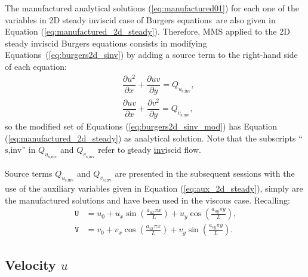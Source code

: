 \documentclass[10pt]{article}
\newcommand{\diff}[2] {\dfrac{\partial #1}{\partial #2}}
\newcommand{\U}{\,\mathtt{U}}
\newcommand{\V}{\,\mathtt{V}}
\begin{document}
The manufactured analytical solutions (\ref{eq:manufactured01}) for each one of the variables in 2D steady inviscid case of Burgers equations~are also given in Equation (\ref{eq:manufactured_2d_steady}).
%
Therefore, MMS applied to the 2D steady inviscid Burgers equations consists in modifying Equations~(\ref{eq:burgers2d_sinv}) by adding a source term to the right-hand side of each equation:
\begin{equation}
 \label{eq:burgers2d_sinv_mod}
\begin{split}
 & \diff{ u^2 }{x}+\diff{uv}{y}= Q_{u_\text{s,inv}},\\
& \diff{ u v}{x} + \diff{  v^2 }{y}=Q_{v_\text{s,inv}},
\end{split}
\end{equation}
so the modified set of Equations (\ref{eq:burgers2d_sinv_mod}) has Equation (\ref{eq:manufactured_2d_steady}) as analytical solution. Note that the subscripts ``$\text{s,inv}$'' in $Q_{u_\text{s,inv}}$ and $Q_{v_\text{s,inv}}$  refer to \underline{s}teady \underline{inv}iscid flow.


Source terms $Q_{u_\text{s,inv}}$ and $Q_{v_\text{s,inv}}$ are presented in the subsequent sessions with the use of the auxiliary variables given in Equation (\ref{eq:aux_2d_steady}), simply are the manufactured solutions and have been used in the viscous case. Recalling:
\begin{equation*}
 \begin{split}
\label{eq:aux_2d_steady_recall}
\U &= u_{0}+u_{x} \sin\left(\frac{a_{u x} \pi x}{L}\right)+u_{y} \cos\left(\frac{a_{u y} \pi y}{L}\right) ,\\
\V &= v_{0}+v_{x} \cos\left(\frac{a_{v x} \pi x}{L}\right)+v_{y} \sin\left(\frac{a_{v y} \pi y}{L}\right).
\end{split}
\end{equation*}
%


\subsection{Velocity $u$}
\end{document}
